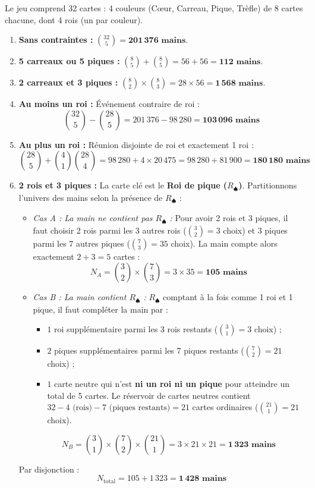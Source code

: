 \documentclass[11pt,a4paper]{article}
\begin{document}
\begin{correctionbox}
Le jeu comprend 32 cartes : 4 couleurs (Cœur, Carreau, Pique, Trèfle) de 8 cartes chacune, dont 4 rois (un par couleur).
\begin{enumerate}[label=\arabic*.]
    \item \textbf{Sans contraintes :} $\binom{32}{5} = \mathbf{201\,376\text{ mains}}$.
    \item \textbf{5 carreaux ou 5 piques :} $\binom{8}{5} + \binom{8}{5} = 56 + 56 = \mathbf{112\text{ mains}}$.
    \item \textbf{2 carreaux et 3 piques :} $\binom{8}{2} \times \binom{8}{3} = 28 \times 56 = \mathbf{1\,568\text{ mains}}$.
    \item \textbf{Au moins un roi :} Événement contraire de  roi \fg{} :
    \[
    \binom{32}{5} - \binom{28}{5} = 201\,376 - 98\,280 = \mathbf{103\,096\text{ mains}}
    \]
    \item \textbf{Au plus un roi :} Réunion disjointe de  roi \fg{} et \og exactement 1 roi \fg{} :
    \[
    \binom{28}{5} + \binom{4}{1} \binom{28}{4} = 98\,280 + 4 \times 20\,475 = 98\,280 + 81\,900 = \mathbf{180\,180\text{ mains}}
    \]
    \item \textbf{2 rois et 3 piques :}
    La carte clé est le \textbf{Roi de pique ($R_\spadesuit$)}. Partitionnons l'univers des mains selon la présence de $R_\spadesuit$ :
    \begin{itemize}[label=$\bullet$]
        \item \emph{Cas A : La main ne contient pas $R_\spadesuit$ :}
        Pour avoir 2 rois et 3 piques, il faut choisir 2 rois parmi les 3 autres rois ($\binom{3}{2} = 3$ choix) et 3 piques parmi les 7 autres piques ($\binom{7}{3} = 35$ choix).
        La main compte alors exactement $2 + 3 = 5$ cartes :
        \[
        N_A = \binom{3}{2} \times \binom{7}{3} = 3 \times 35 = \mathbf{105\text{ mains}}
        \]
        \item \emph{Cas B : La main contient $R_\spadesuit$ :}
        $R_\spadesuit$ comptant à la fois comme 1 roi et 1 pique, il faut compléter la main par :
        \begin{itemize}
            \item $1$ roi supplémentaire parmi les 3 rois restants ($\binom{3}{1} = 3$ choix) ;
            \item $2$ piques supplémentaires parmi les 7 piques restants ($\binom{7}{2} = 21$ choix) ;
            \item $1$ carte neutre qui n'est \textbf{ni un roi ni un pique} pour atteindre un total de 5 cartes. Le réservoir de cartes neutres contient $32 - 4 \text{ (rois)} - 7 \text{ (piques restants)} = 21$ cartes ordinaires ($\binom{21}{1} = 21$ choix).
        \end{itemize}
        \[
        N_B = \binom{3}{1} \times \binom{7}{2} \times \binom{21}{1} = 3 \times 21 \times 21 = \mathbf{1\,323\text{ mains}}
        \]
    \end{itemize}
    Par disjonction :
    \[
    N_{\text{total}} = 105 + 1\,323 = \mathbf{1\,428\text{ mains}}
    \]
\end{enumerate}
\end{correctionbox}
\end{document}
